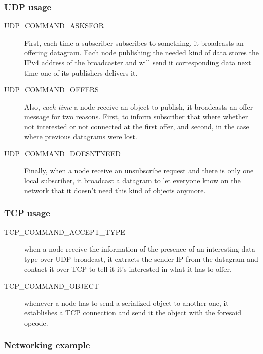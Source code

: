 \documentclass{beamer}
\begin{document}
\subsubsection{UDP usage}
\begin{frame}
  \begin{description}
  \item[UDP\_COMMAND\_ASKSFOR]
    First, each time a subscriber subscribes to something, it broadcasts an offering datagram. Each node publishing the needed kind of data stores the IPv4 address of the broadcaster and will send it corresponding data next time one of its publishers delivers it.

  \item[UDP\_COMMAND\_OFFERS]
    Also, \emph{each time} a node receive an object to publish, it broadcasts
    an offer message for two reasons. First, to inform subscriber that where whether not interested or not connected at
    the first offer, and second, in the case where previous datagrams were lost.

  \item[UDP\_COMMAND\_DOESNTNEED]
    Finally, when a node receive an unsubscribe request and there is only
    one local subscriber, it broadcast a datagram to let everyone know on the network that it doesn't need this kind of
    objects anymore.
  \end{description}
\end{frame}

\subsubsection{TCP usage}
\begin{frame}
  \begin{description}
  \item[TCP\_COMMAND\_ACCEPT\_TYPE]
    when a node receive the information of the presence of an interesting data type over UDP broadcast, it extracts the sender IP from the datagram and contact it over TCP to tell it it's interested in what it has to offer.

  \item[TCP\_COMMAND\_OBJECT ]
    whenever a node has to send a serialized object to another one, it establishes a TCP connection and send it the object with the foresaid opcode.
  \end{description}
\end{frame}

\subsubsection{Networking example}
\begin{frame}

\end{frame}
\end{document}
